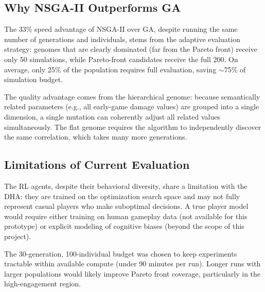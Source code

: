 \subsection{Why NSGA-II Outperforms GA}

The 33\% speed advantage of NSGA-II over GA, despite running the same number of generations and individuals, stems from the adaptive evaluation strategy: genomes that are clearly dominated (far from the Pareto front) receive only 50 simulations, while Pareto-front candidates receive the full 200. On average, only 25\% of the population requires full evaluation, saving $\sim$75\% of simulation budget.

The quality advantage comes from the hierarchical genome: because semantically related parameters (e.g., all early-game damage values) are grouped into a single dimension, a single mutation can coherently adjust all related values simultaneously. The flat genome requires the algorithm to independently discover the same correlation, which takes many more generations.

\subsection{Limitations of Current Evaluation}

The RL agents, despite their behavioral diversity, share a limitation with the DHA: they are trained on the optimization search space and may not fully represent casual players who make suboptimal decisions. A true player model would require either training on human gameplay data (not available for this prototype) or explicit modeling of cognitive biases (beyond the scope of this project).

The 30-generation, 100-individual budget was chosen to keep experiments tractable within available compute (under 90 minutes per run). Longer runs with larger populations would likely improve Pareto front coverage, particularly in the high-engagement region.
